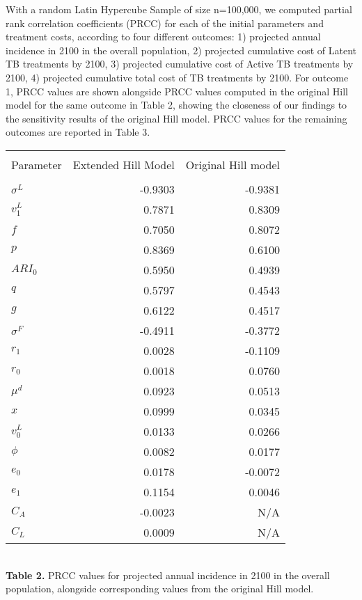 \documentclass{article}[11pt]
\begin{document}
With a random Latin Hypercube Sample of size n=100,000, we computed partial rank correlation coefficients (PRCC) for each of the initial parameters and treatment costs, according to four different outcomes: 1) projected annual incidence in 2100 in the overall population, 2) projected cumulative cost of Latent TB treatments by 2100, 3) projected cumulative cost of Active TB treatments by 2100, 4) projected cumulative total cost of TB treatments by 2100.  For outcome 1, PRCC values are shown alongside PRCC values computed in the original Hill model for the same outcome in Table 2, showing the closeness of our findings to the sensitivity results of the original Hill model.  PRCC values for the remaining outcomes are reported in Table 3.  \\

\begin{table}[h]
\centering
\begin{tabular}{l r r}
\hline\hline\\
Parameter & Extended Hill Model & Original Hill model \\ [0.5ex]
\hline\\
$\sigma^{L}$  & -0.9303 & -0.9381 \\
$v^{L}_{1}$   & 0.7871  & 0.8309 \\
$f$                 & 0.7050  & 0.8072 \\
$p$                & 0.8369  & 0.6100 \\
$ARI_{0}$      & 0.5950  & 0.4939 \\
$q$                & 0.5797  & 0.4543 \\
$g$                & 0.6122  & 0.4517 \\
$\sigma^{F}$ & -0.4911 & -0.3772 \\
$r_{1}$          & 0.0028  & -0.1109 \\
$r_{0}$          & 0.0018  & 0.0760 \\
$\mu^{d}$      & 0.0923 & 0.0513 \\
$x$                 & 0.0999 & 0.0345 \\
$v^{L}_{0}$    & 0.0133 & 0.0266 \\
$\phi$             & 0.0082 & 0.0177 \\
$e_{0}$          & 0.0178 & -0.0072 \\
$e_{1}$          & 0.1154 & 0.0046 \\
$C_{A}$          & -0.0023 & N/A \\
$C_{L}$           & 0.0009 & N/A \\ [1ex]
\hline
\end{tabular}\\[1ex]

{\bf Table 2.} PRCC values for projected annual incidence in 2100
 in the overall population, alongside corresponding values from the
original Hill model.
\end{table}
\end{document}
